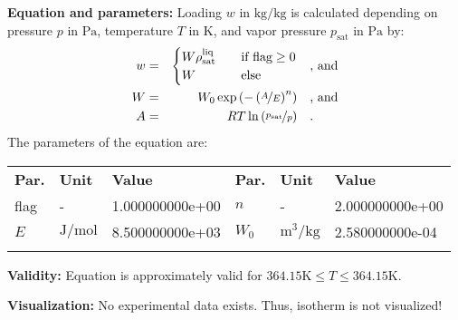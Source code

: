 \textbf{Equation and parameters:}
\newline
%
Loading $w$ in $\si{\kilogram\per\kilogram}$ is calculated depending on pressure $p$ in $\si{\pascal}$, temperature $T$ in $\si{\kelvin}$, and vapor pressure $p_\mathrm{sat}$ in $\si{\pascal}$ by:
%
\begin{equation*}
\begin{split}
w &=& \begin{cases} W \rho_\mathrm{sat}^{\mathrm{liq}} & \quad \text{if flag} \geq 0 \\ W & \quad \text{else} \end{cases} & \quad\text{, and} \\
W &=& W_0 \exp \left( - \left( \nicefrac{A}{E} \right) ^{n} \right) & \quad\text{, and} \\
A &=& R T \ln \left( \nicefrac{p_\mathrm{sat}}{p} \right) & \quad\text{.} \\
\end{split}
\end{equation*}
%
The parameters of the equation are:
%
\begin{longtable}[l]{lll|lll}
\toprule
\addlinespace
\textbf{Par.} & \textbf{Unit} & \textbf{Value} &	\textbf{Par.} & \textbf{Unit} & \textbf{Value} \\
\addlinespace
\midrule
\endhead

\bottomrule
\endfoot
\bottomrule
\endlastfoot
\addlinespace

flag & - & 1.000000000e+00 & $n$ & - & 2.000000000e+00 \\
$E$ & $\si{\joule\per\mole}$ & 8.500000000e+03 & $W_0$ & $\si{\cubic\meter\per\kilogram}$ & 2.580000000e-04 \\

\addlinespace\end{longtable}

\textbf{Validity:}
\newline
Equation is approximately valid for $364.15 \si{\kelvin} \leq T \leq 364.15 \si{\kelvin}$.
\newline

\textbf{Visualization:}
%
\newline
No experimental data exists. Thus, isotherm is not visualized!
%

\FloatBarrier
\newpage
